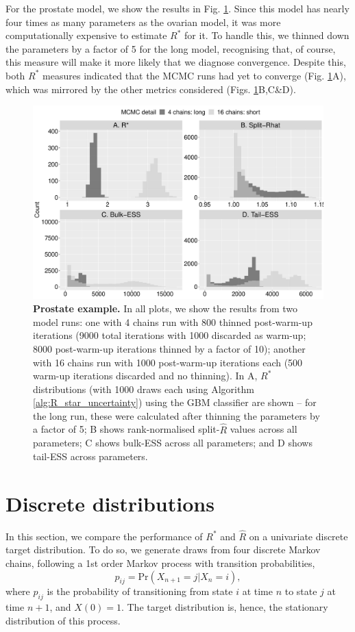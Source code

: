 \documentclass[ba]{imsart}
\numberwithin{equation}{section}
\theoremstyle{plain}
\begin{document}
\begin{supplement}
		For the prostate model, we show the results in Fig. \ref{fig:prostate}. Since this model has nearly four times as many parameters as the ovarian model, it was more computationally expensive to estimate $R^*$ for it. To handle this, we thinned down the parameters by a factor of 5 for the long model, recognising that, of course, this measure will make it more likely that we diagnose convergence. Despite this, both $R^*$ measures indicated that the MCMC runs had yet to converge (Fig. \ref{fig:prostate}A), which was mirrored by the other metrics considered (Figs. \ref{fig:prostate}B,C\&D).
		
		\begin{figure}[!htb]
			\centerline{\includegraphics[width=1.0\textwidth]{prostate.pdf}}
			\caption{\textbf{Prostate example.} In all plots, we show the results from two model runs: one with 4 chains run with 800 thinned post-warm-up iterations (9000 total iterations with 1000 discarded as warm-up; 8000 post-warm-up iterations thinned by a factor of 10); another with 16 chains run with 1000 post-warm-up iterations each (500 warm-up iterations discarded and no thinning). In A, $R^*$ distributions (with 1000 draws each using Algorithm \ref{alg:R_star_uncertainty}) using the GBM classifier are shown -- for the long run, these were calculated after thinning the parameters by a factor of 5; B shows rank-normalised split-$\widehat{R}$ values across all parameters; C shows bulk-ESS across all parameters; and D shows tail-ESS across parameters.}
			\label{fig:prostate}
		\end{figure}
		
		\section{Discrete distributions}\label{sec:discrete}
		In this section, we compare the performance of $R^*$ and $\widehat{R}$ on a univariate discrete target distribution. To do so, we generate draws from four discrete Markov chains, following a 1st order Markov process with transition probabilities,
		\begin{equation}
		p_{ij} = \text{Pr}(X_{n+1}=j|X_n=i),
		\end{equation}
		where $p_{ij}$ is the probability of transitioning from state $i$ at time $n$ to state $j$ at time $n+1$, and $X(0)=1$. The target distribution is, hence, the stationary distribution of this process.
		

\end{supplement}
\end{document}
